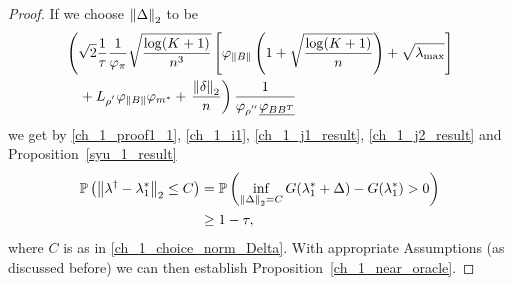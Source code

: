 \begin{proof}


If we choose
$
\left\lVert\Delta\right\rVert_2
$
to be
\begin{align}
  \label{ch_1_choice_norm_Delta}
  \begin{split} 
    &\left(
     \sqrt{2}
    \frac{1}{\tau}
    \frac{1}{\varphi_{\pi}}
    \sqrt{
      \frac{
        \log(K + 1)
      }
      {
        n^3
      }
    }
    \left[
      \varphi_{\left\lVert B\right\rVert}
      \left(
        1
        +
        \sqrt{
          \frac{\log (K + 1)}{n}
        }
      \right)
      +
      \sqrt{
        \lambda_{\max}
      }
  \right]
  \right.
\\
  &
  \quad
  +
     L_{\rho^{'}}
     \varphi_{\left\lVert B\right\rVert}
     \varphi_{m^*}
  +
  \left.
  \frac{
    \left\lVert\delta\right\rVert_2
  }
  {n}
  \right)
  \frac{1}
  {
    \varphi_{\rho^{''}}
    \underline{
      \varphi_{BB^T}
    }
  }
\end{split}
\end{align}
we get by
\eqref{ch_1_proof1_1},
\eqref{ch_1_i1},
\eqref{ch_1_j1_result},
\eqref{ch_1_j2_result}
and 
Proposition~\ref{syu_1_result}
\begin{align}
  \label{ch_1_near_oracle_probabilistic_bound}
  \begin{split}
  \mathbb{P}
  \left( 
      \left\lVert
        \lambda^\dagger
        -
        \lambda^*_1
      \right\rVert_2
      \le
      C 
  \right)
  &=
  \mathbb{P}
  \left( 
    \inf_{\left\lVert\Delta\right\rVert_2 = C}
    G(\lambda^*_1 + \Delta) 
    -
    G(\lambda^*_1)
    >
    0
  \right)
  \\
  &\ge
  1 - \tau,
  \end{split}
\end{align}
where 
$
  C
$
is as in 
\eqref{ch_1_choice_norm_Delta}.
With appropriate Assumptions (as discussed before) we can then establish
Proposition~\ref{ch_1_near_oracle}.


\end{proof}
